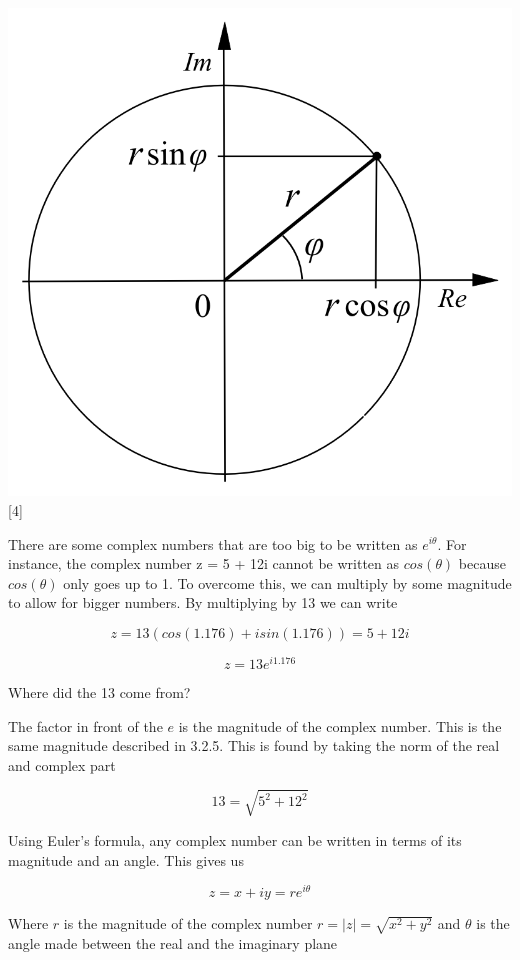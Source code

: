 \documentclass{book}
\begin{document}
\begin{center}
    \includegraphics{images/Polar_Argand-diagram.png}
    [4]
\end{center}

There are some complex numbers that are too big to be written as $e^{i\theta}$. For instance, the complex number z = 5 + 12i cannot be written as $cos(\theta)$ because $cos(\theta)$ only goes up to 1. To overcome this, we can multiply by some magnitude to allow for bigger numbers. By multiplying by 13 we can write 

$$ z = 13(cos(1.176) + i sin(1.176) )= 5 + 12i $$

$$ z = 13e^{i 1.176}$$

Where did the 13 come from? 

The factor in front of the $e$ is the magnitude of the complex number. This is the same magnitude described in 3.2.5. This is found by taking the norm of the real and complex part 

$$ 13 = \sqrt{ 5^2 + 12^2} $$

Using Euler's formula, any complex number can be written in terms of its magnitude and an angle. This gives us 

$$z = x + iy = re^{i\theta}$$ 

Where $r$ is the magnitude of the complex number $r = |z| = \sqrt{x^2 + y^2}$ and $\theta$ is the angle made between the real and the imaginary plane
\end{document}
